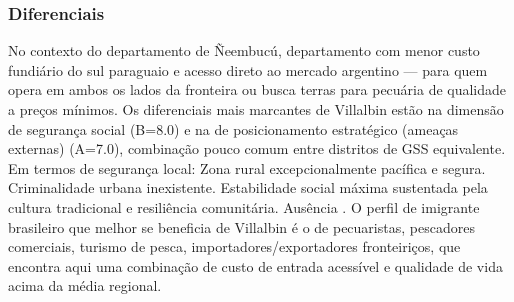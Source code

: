 \subsubsection*{Diferenciais}\label{dif-villalbin-1216}
No contexto do departamento de Ñeembucú, departamento com menor custo fundiário do sul paraguaio e acesso direto ao mercado argentino — para quem opera em ambos os lados da fronteira ou busca terras para pecuária de qualidade a preços mínimos. Os diferenciais mais marcantes de Villalbin estão na dimensão de segurança social (B=8.0) e na de posicionamento estratégico (ameaças externas) (A=7.0), combinação pouco comum entre distritos de GSS equivalente. Em termos de segurança local: Zona rural excepcionalmente pacífica e segura. Criminalidade urbana inexistente. Estabilidade social máxima sustentada pela cultura tradicional e resiliência comunitária. Ausência . O perfil de imigrante brasileiro que melhor se beneficia de Villalbin é o de pecuaristas, pescadores comerciais, turismo de pesca, importadores/exportadores fronteiriços, que encontra aqui uma combinação de custo de entrada acessível e qualidade de vida acima da média regional.
